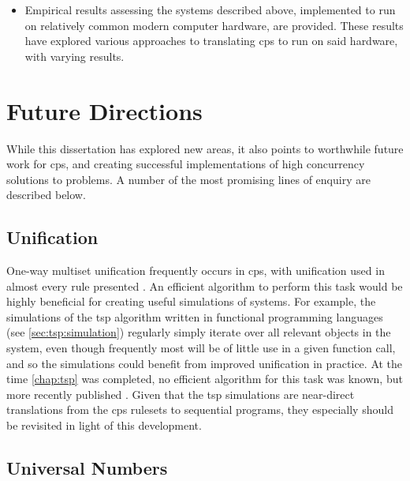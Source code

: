 \begin{itemize}
    \item Empirical results assessing the systems described above, implemented to run on relatively common modern computer hardware, are provided.  These results have explored various approaches to translating \gls{cps} to run on said hardware, with varying results.
\end{itemize}

\section{Future Directions}

While this dissertation has explored new areas, it also points to worthwhile future work for \gls{cps}, and creating successful implementations of high concurrency solutions to problems.  A number of the most promising lines of enquiry are described below.


\subsection{Unification}

One-way multiset unification frequently occurs in \gls{cps}, with unification used in almost every rule presented .  An efficient algorithm to perform this task would be highly beneficial for creating useful simulations of systems.  For example, the simulations of the \gls{tsp} algorithm written in functional programming languages (see \vref{sec:tsp:simulation}) regularly simply iterate over all relevant objects in the system, even though frequently most will be of little use in a given function call, and so the simulations could benefit from improved unification in practice.  At the time \cref{chap:tsp} was completed, no efficient algorithm for this task was known, but more recently \citeauthor{Liu2021} published  \cite{Liu2021}.  Given that the \gls{tsp} simulations are near-direct translations from the \gls{cps} \glspl{ruleset} to sequential programs, they especially should be revisited in light of this development.


\subsection{Universal Numbers}

